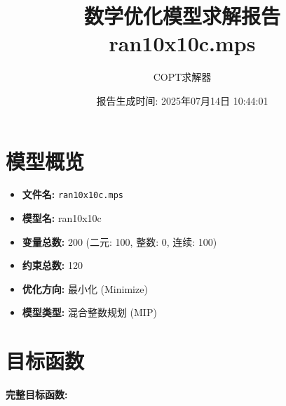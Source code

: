 \documentclass[a4paper,10pt]{article}
\title{数学优化模型求解报告\\{\large ran10x10c.mps}}
\author{COPT求解器}
\date{报告生成时间: 2025年07月14日 10:44:01}
\begin{document}
\maketitle
\tableofcontents
\newpage

\section{模型概览}
\begin{itemize}
    \item \textbf{文件名:} \texttt{ran10x10c.mps}
    \item \textbf{模型名:} ran10x10c
    \item \textbf{变量总数:} 200 (二元: 100, 整数: 0, 连续: 100)
    \item \textbf{约束总数:} 120
    \item \textbf{优化方向:} 最小化 (Minimize)
    \item \textbf{模型类型:} 混合整数规划 (MIP)
\end{itemize}
\section{目标函数}

\textbf{完整目标函数:}
\end{document}
